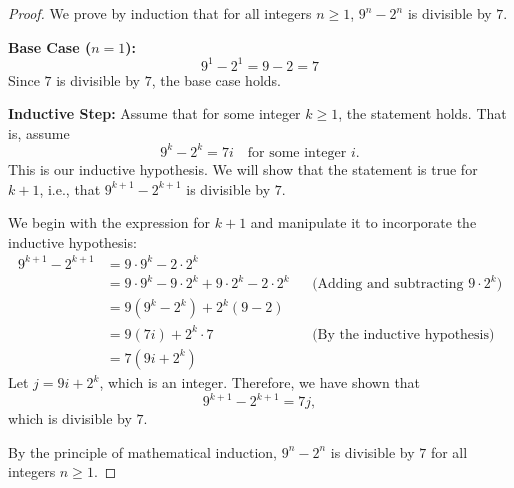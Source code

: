 \documentclass{article}
\begin{document}
\begin{proof}
We prove by induction that for all integers $n \geq 1$, $9^n - 2^n$ is divisible by $7$.

\textbf{Base Case ($n = 1$):}
\[
9^1 - 2^1 = 9 - 2 = 7
\]
Since $7$ is divisible by $7$, the base case holds.

\textbf{Inductive Step:} Assume that for some integer $k \geq 1$, the statement holds. That is, assume
\[
9^k - 2^k = 7i \quad \text{for some integer } i.
\]
This is our inductive hypothesis. We will show that the statement is true for $k+1$, i.e., that $9^{k+1} - 2^{k+1}$ is divisible by $7$.

We begin with the expression for $k+1$ and manipulate it to incorporate the inductive hypothesis:
\begin{align*}
9^{k+1} - 2^{k+1} &= 9 \cdot 9^k - 2 \cdot 2^k \\
&= 9 \cdot 9^k - 9 \cdot 2^k + 9 \cdot 2^k - 2 \cdot 2^k && \text{(Adding and subtracting } 9 \cdot 2^k \text{)} \\
&= 9(9^k - 2^k) + 2^k(9 - 2) \\
&= 9(7i) + 2^k \cdot 7 && \text{(By the inductive hypothesis)} \\
&= 7(9i + 2^k)
\end{align*}
Let $j = 9i + 2^k$, which is an integer. Therefore, we have shown that
\[
9^{k+1} - 2^{k+1} = 7j,
\]
which is divisible by $7$.

By the principle of mathematical induction, $9^n - 2^n$ is divisible by $7$ for all integers $n \geq 1$.
\end{proof}    
\end{document}
